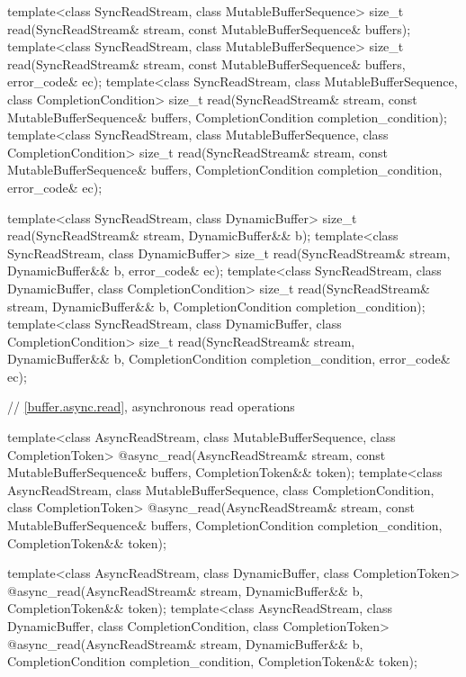 \begin{codeblock}
{  template<class SyncReadStream, class MutableBufferSequence>
    size_t read(SyncReadStream& stream,
                const MutableBufferSequence& buffers);
  template<class SyncReadStream, class MutableBufferSequence>
    size_t read(SyncReadStream& stream,
                const MutableBufferSequence& buffers, error_code& ec);
  template<class SyncReadStream, class MutableBufferSequence,
    class CompletionCondition>
      size_t read(SyncReadStream& stream,
                  const MutableBufferSequence& buffers,
                  CompletionCondition completion_condition);
  template<class SyncReadStream, class MutableBufferSequence,
    class CompletionCondition>
      size_t read(SyncReadStream& stream,
                  const MutableBufferSequence& buffers,
                  CompletionCondition completion_condition,
                  error_code& ec);

  template<class SyncReadStream, class DynamicBuffer>
    size_t read(SyncReadStream& stream, DynamicBuffer&& b);
  template<class SyncReadStream, class DynamicBuffer>
    size_t read(SyncReadStream& stream, DynamicBuffer&& b, error_code& ec);
  template<class SyncReadStream, class DynamicBuffer, class CompletionCondition>
    size_t read(SyncReadStream& stream, DynamicBuffer&& b,
                CompletionCondition completion_condition);
  template<class SyncReadStream, class DynamicBuffer, class CompletionCondition>
    size_t read(SyncReadStream& stream, DynamicBuffer&& b,
                CompletionCondition completion_condition, error_code& ec);

  // \ref{buffer.async.read}, asynchronous read operations

  template<class AsyncReadStream, class MutableBufferSequence,
    class CompletionToken>
      @\DEDUCED@ async_read(AsyncReadStream& stream,
                         const MutableBufferSequence& buffers,
                         CompletionToken&& token);
  template<class AsyncReadStream, class MutableBufferSequence,
    class CompletionCondition, class CompletionToken>
      @\DEDUCED@ async_read(AsyncReadStream& stream,
                         const MutableBufferSequence& buffers,
                         CompletionCondition completion_condition,
                         CompletionToken&& token);

  template<class AsyncReadStream, class DynamicBuffer, class CompletionToken>
    @\DEDUCED@ async_read(AsyncReadStream& stream,
                       DynamicBuffer&& b, CompletionToken&& token);
  template<class AsyncReadStream, class DynamicBuffer,
    class CompletionCondition, class CompletionToken>
      @\DEDUCED@ async_read(AsyncReadStream& stream,
                         DynamicBuffer&& b,
                         CompletionCondition completion_condition,
                         CompletionToken&& token);

}
\end{codeblock}
